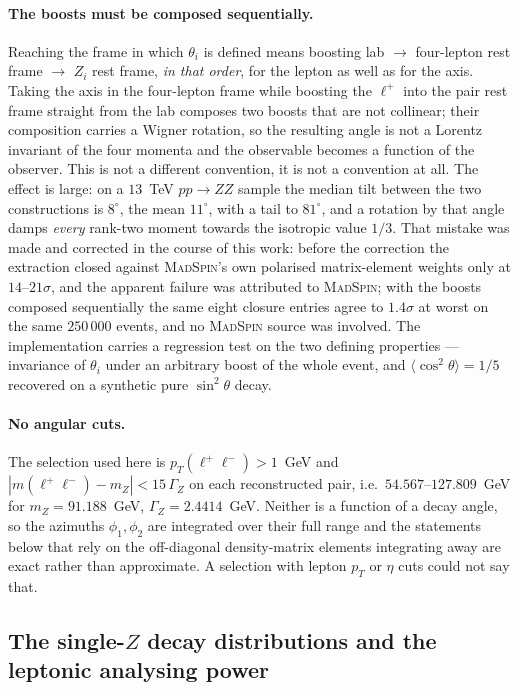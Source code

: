 \documentclass[a4paper,11pt]{article}
\providecommand{\ms}{{\textsc{MadSpin}}}
\providecommand{\fourl}{four-lepton}
\begin{document}
\paragraph{The boosts must be composed sequentially.} Reaching the frame in
which $\theta_i$ is defined means boosting lab $\to$ \fourl{} rest frame $\to$
$Z_i$ rest frame, \emph{in that order}, for the lepton as well as for the axis.
Taking the axis in the \fourl{} frame while boosting the $\ell^+$ into the pair
rest frame straight from the lab composes two boosts that are not collinear;
their composition carries a Wigner rotation, so the resulting angle is not a
Lorentz invariant of the four momenta and the observable becomes a function of
the observer. This is not a different convention, it is not a convention at
all. The effect is large: on a $13$~TeV $pp\to ZZ$ sample the median tilt
between the two constructions is $8^\circ$, the mean $11^\circ$, with a tail to
$81^\circ$, and a rotation by that angle damps \emph{every} rank-two moment
towards the isotropic value $1/3$. That mistake was made and corrected in the
course of this work: before the correction the extraction closed against
\ms's own polarised matrix-element weights only at $14$--$21\sigma$, and the
apparent failure was attributed to \ms; with the boosts composed sequentially
the same eight closure entries agree to $1.4\sigma$ at worst on the same
$250\,000$ events, and no \ms{} source was involved. The implementation carries
a regression test on the two defining properties --- invariance of $\theta_i$
under an arbitrary boost of the whole event, and
$\langle\cos^2\theta\rangle=1/5$ recovered on a synthetic pure $\sin^2\theta$
decay.

\paragraph{No angular cuts.} The selection used here is $p_T(\ell^+\ell^-)>1$~GeV
and $|m(\ell^+\ell^-)-m_Z|<15\,\Gamma_Z$ on each reconstructed pair, i.e.\
$54.567$--$127.809$~GeV for $m_Z=91.188$~GeV, $\Gamma_Z=2.4414$~GeV. Neither is
a function of a decay angle, so the azimuths $\phi_1,\phi_2$ are integrated
over their full range and the statements below that rely on the off-diagonal
density-matrix elements integrating away are exact rather than approximate. A
selection with lepton $p_T$ or $\eta$ cuts could not say that.

\subsection{The single-$Z$ decay distributions and the leptonic analysing power}
\label{subsec:spinobs_etal}
\end{document}
